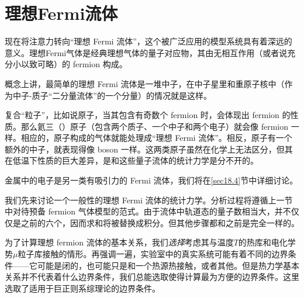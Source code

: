 \section{理想Fermi流体}\label{sec18.2}
现在将注意力转向``理想 Fermi 流体''，这个被广泛应用的模型系统具有着深远的意义。理想Fermi气体是经典理想气体的量子对应物，其由无相互作用（或者说充分小以致可略）的 fermion 构成。

概念上讲，最简单的理想 Fermi 流体是一堆中子，在中子星里和重原子核中（作为中子-质子``二分量流体''的一个分量）的情况就是这样。

复合``粒子''，比如说原子，当其包含有奇数个 fermion 时，会体现出 fermion 的性质。那么氦三（）原子（包含两个质子、一个中子和两个电子）就会像 fermion 一样。相应的，原子构成的气体就能处理成``理想 Fermi 流体''。相反，原子有一个额外的中子，就表现得像 boson 一样。这两类原子虽然在化学上无法区分，但其在低温下性质的巨大差异，是和这些量子流体的统计力学是分不开的。

金属中的电子是另一类有吸引力的 Fermi 流体，我们将在\ref{sec18.4}节中详细讨论。

我们先来讨论一个一般性的理想 Fermi 流体的统计力学。分析过程将遵循上一节中对待预备 fermion 气体模型的范式。由于流体中轨道态的量子数相当大，并不仅仅是之前的六个，因而求和将被替换成积分。但其他步骤都和之前是完全一样的。

为了计算理想 fermion 流体的基本关系，我们{\it 选择}考虑其与温度$T$的热库和电化学势$\mu$粒子库接触的情形。再强调一遍，实验室中的真实系统可能有着不同的边界条件——它可能是闭的，也可能只是和一个热源热接触，或者其他。但是热力学基本关系并不代表着什么边界条件，我们总能选取使得计算最为方便的边界条件。这里选取了适用于巨正则系综理论的边界条件。


